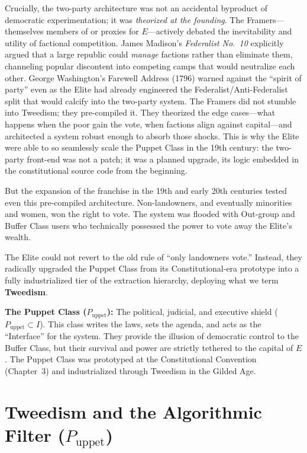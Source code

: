 \documentclass[12pt,openany]{book}
\begin{document}
Crucially, the two-party architecture was not an accidental byproduct of democratic experimentation; it was \textit{theorized at the founding}. The Framers---themselves members of or proxies for $E$---actively debated the inevitability and utility of factional competition. James Madison's \textit{Federalist No.~10} explicitly argued that a large republic could \textit{manage} factions rather than eliminate them, channeling popular discontent into competing camps that would neutralize each other. George Washington's Farewell Address (1796) warned against the ``spirit of party'' even as the Elite had already engineered the Federalist/Anti-Federalist split that would calcify into the two-party system. The Framers did not stumble into Tweedism; they pre-compiled it. They theorized the edge cases---what happens when the poor gain the vote, when factions align against capital---and architected a system robust enough to absorb those shocks. This is why the Elite were able to so seamlessly scale the Puppet Class in the 19th century: the two-party front-end was not a patch; it was a planned upgrade, its logic embedded in the constitutional source code from the beginning.

But the expansion of the franchise in the 19th and early 20th centuries tested even this pre-compiled architecture. Non-landowners, and eventually minorities and women, won the right to vote. The system was flooded with Out-group and Buffer Class users who technically possessed the power to vote away the Elite's wealth.

The Elite could not revert to the old rule of ``only landowners vote.'' Instead, they radically upgraded the Puppet Class from its Constitutional-era prototype into a fully industrialized tier of the extraction hierarchy, deploying what we term \textbf{Tweedism}.

\begin{definition}
\textbf{The Puppet Class ($P_{\text{uppet}}$):} The political, judicial, and executive shield ($P_{\text{uppet}} \subset I$). This class writes the laws, sets the agenda, and acts as the ``Interface'' for the system. They provide the illusion of democratic control to the Buffer Class, but their survival and power are strictly tethered to the capital of $E$. The Puppet Class was prototyped at the Constitutional Convention (Chapter~3) and industrialized through Tweedism in the Gilded Age.
\end{definition}

\section{Tweedism and the Algorithmic Filter (\texorpdfstring{$P_{\text{uppet}}$}{P\_uppet})}
\end{document}
